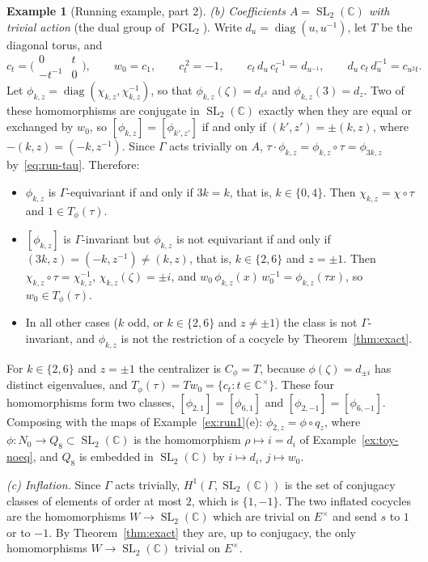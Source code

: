 \documentclass[12pt,letterpaper]{article}
\numberwithin{equation}{section}
\theoremstyle{plain}
\theoremstyle{definition}
\newtheorem{example}[theorem]{Example}
\newcommand{\C}{\mathbb{C}}
\newcommand{\pmat}[4]{\bigl(\begin{smallmatrix}#1&#2\\#3&#4\end{smallmatrix}\bigr)}
\DeclareMathOperator{\SL}{SL}
\DeclareMathOperator{\PGL}{PGL}
\DeclareMathOperator{\diag}{diag}
\begin{document}
\begin{example}[Running example, part 2]
\smallskip\noindent\emph{(b) Coefficients $A=\SL_2(\C)$ with trivial
action} (the dual group of $\PGL_2$). Write $d_u=\diag(u,u^{-1})$, let $T$
be the diagonal torus, and
\[
c_t=\pmat{0}{t}{-t^{-1}}{0},\qquad w_0=c_1,\qquad
c_t^{\,2}=-1,\qquad c_t\,d_u\,c_t^{-1}=d_{u^{-1}},\qquad
d_u\,c_t\,d_u^{-1}=c_{u^2t}.
\]
Let $\phi_{k,z}=\diag(\chi_{k,z},\chi_{k,z}^{-1})$, so that
$\phi_{k,z}(\zeta)=d_{\varepsilon^k}$ and $\phi_{k,z}(3)=d_z$. Two of
these homomorphisms are conjugate in $\SL_2(\C)$ exactly when they are
equal or exchanged by $w_0$, so
$[\phi_{k,z}]=[\phi_{k',z'}]$ if and only if $(k',z')=\pm(k,z)$, where
$-(k,z)=(-k,z^{-1})$. Since $\Gamma$ acts trivially on $A$,
$\tau\cdot\phi_{k,z}=\phi_{k,z}\circ\tau=\phi_{3k,z}$
by~\eqref{eq:run-tau}. Therefore:
\begin{itemize}[itemsep=1pt]
\item $\phi_{k,z}$ is $\Gamma$-equivariant if and only if $3k=k$, that is,
$k\in\{0,4\}$. Then $\chi_{k,z}=\chi\circ\tau$ and $1\in T_\phi(\tau)$.
\item $[\phi_{k,z}]$ is $\Gamma$-invariant but $\phi_{k,z}$ is not
equivariant if and only if $(3k,z)=(-k,z^{-1})\neq(k,z)$, that is,
$k\in\{2,6\}$ and $z=\pm1$. Then $\chi_{k,z}\circ\tau=\chi_{k,z}^{-1}$,
$\chi_{k,z}(\zeta)=\pm i$, and
$w_0\,\phi_{k,z}(x)\,w_0^{-1}=\phi_{k,z}(\tau x)$, so
$w_0\in T_\phi(\tau)$.
\item In all other cases ($k$ odd, or $k\in\{2,6\}$ and $z\neq\pm1$) the
class is not $\Gamma$-invariant, and $\phi_{k,z}$ is not the restriction
of a cocycle by Theorem~\ref{thm:exact}.
\end{itemize}
For $k\in\{2,6\}$ and $z=\pm1$ the centralizer is $C_\phi=T$, because
$\phi(\zeta)=d_{\pm i}$ has distinct eigenvalues, and
$T_\phi(\tau)=Tw_0=\{c_t:t\in\C^\times\}$. These four homomorphisms form
two classes, $[\phi_{2,1}]=[\phi_{6,1}]$ and
$[\phi_{2,-1}]=[\phi_{6,-1}]$. Composing with the maps of
Example~\ref{ex:run1}(e): $\phi_{2,z}=\phi\circ q_z$, where
$\phi:N_0\to Q_8\subset\SL_2(\C)$ is the homomorphism
$\rho\mapsto i=d_i$ of Example~\ref{ex:toy-noeq}, and $Q_8$ is embedded
in $\SL_2(\C)$ by $i\mapsto d_i$, $j\mapsto w_0$.

\smallskip\noindent\emph{(c) Inflation.} Since $\Gamma$ acts trivially,
$H^1(\Gamma,\SL_2(\C))$ is the set of conjugacy classes of elements of
order at most $2$, which is $\{1,-1\}$. The two inflated cocycles are the
homomorphisms $W\to\SL_2(\C)$ which are trivial on $E^\times$ and send $s$
to $1$ or to $-1$. By Theorem~\ref{thm:exact} they are, up to conjugacy,
the only homomorphisms $W\to\SL_2(\C)$ trivial on $E^\times$.
\end{example}
\end{document}

